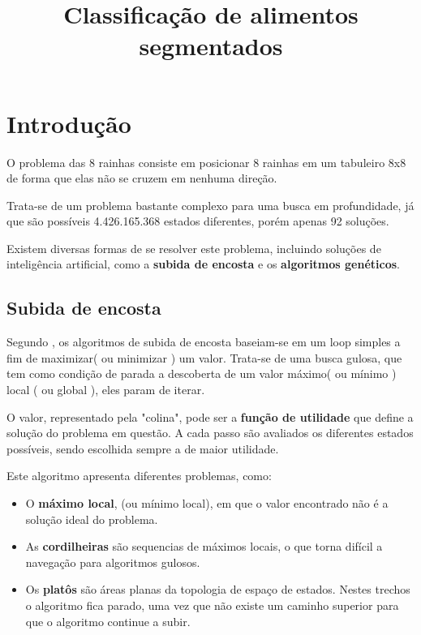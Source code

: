 \documentclass[conference]{IEEEtran}
\begin{document}
	\title{Classificação de alimentos segmentados}
	
	\author{
		 }
	
	\maketitle
	
	
	\section{Introdução}
	\IEEEPARstart
	O problema das 8 rainhas consiste em posicionar 8 rainhas em um tabuleiro 
	8x8 de forma que elas não se cruzem em nenhuma direção.
	
	Trata-se de um problema bastante complexo para uma busca em profundidade, 
	já que são possíveis 4.426.165.368 estados diferentes, porém apenas 92 soluções. \cite{wiki8queen}
	
	Existem diversas formas de se resolver este problema, incluindo soluções de inteligência artificial,
	como a \textbf{subida de encosta} e os \textbf{algoritmos genéticos}.
	\subsection{Subida de encosta}
	Segundo \cite{norvig2014inteligencia}, os algoritmos de subida de encosta baseiam-se em um loop simples
	a fim de maximizar( ou minimizar ) um valor. Trata-se de uma busca gulosa, que tem como condição de parada 
	a descoberta de um valor máximo( ou mínimo ) local ( ou global ), eles param de iterar.
	
	O valor, representado pela "colina", pode ser a \textbf{função de utilidade} que define a solução do
	problema em questão. A cada passo são avaliados os diferentes estados possíveis, sendo escolhida sempre a de maior utilidade.
	
	Este algoritmo apresenta diferentes problemas, como:
	
	
	\begin{itemize}
		\item O \textbf{máximo local}, (ou mínimo local), em que o valor encontrado não é
		a solução ideal do problema. 
		\item As \textbf{cordilheiras} são sequencias de máximos locais, o que torna difícil a navegação 
		para algoritmos gulosos.
		\item Os \textbf{platôs} são áreas planas da topologia de espaço de estados. Nestes trechos o algoritmo fica parado, uma vez que não existe um caminho superior para que o algoritmo continue a subir.
	\end{itemize} 
	
\end{document}
